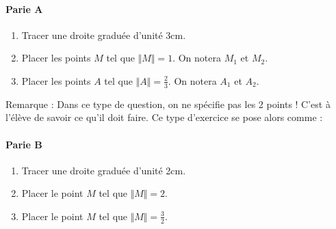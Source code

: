 
\paragraph{Parie A}

\begin{enumerate}
\item Tracer une droite graduée d'unité 3cm.
\item Placer les points $M$ tel que $\Vert M \Vert = 1$. On notera $M_1$ et $M_2$.
\item Placer les points $A$ tel que $\Vert A \Vert = \frac{2}{3}$. On notera $A_1$ et $A_2$.
\end{enumerate}

Remarque : Dans ce type de question, on ne spécifie pas les 2 points ! C'est à l'élève de savoir ce qu'il doit faire. Ce type d'exercice se pose alors comme :

\paragraph{Parie B}

\begin{enumerate}
\item Tracer une droite graduée d'unité 2cm.
\item Placer le point $M$ tel que $\Vert M \Vert = 2$.
\item Placer le point $M$ tel que $\Vert M \Vert = \frac{3}{2}$.
\end{enumerate}